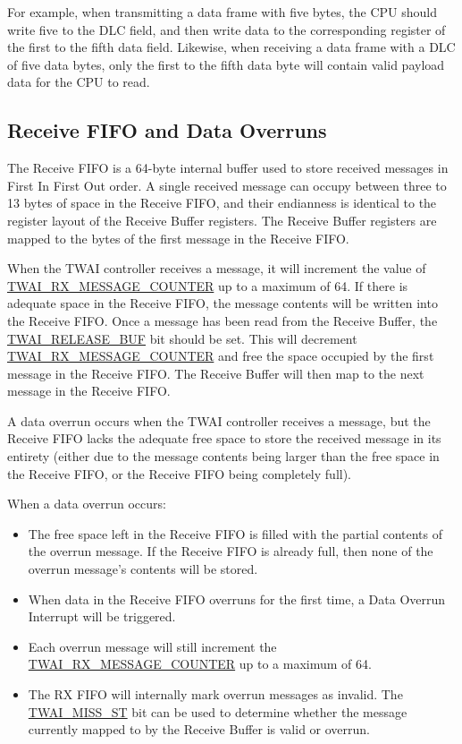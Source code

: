 \documentclass[main\_\_EN.tex]{subfiles}
\begin{document}
For example, when transmitting a data frame with five bytes, the CPU should write five to the DLC field, and then write data to the corresponding register of the first to the fifth data field. Likewise, when receiving a data frame with a DLC of five data bytes, only the first to the fifth data byte will contain valid payload data for the CPU to read.

\subsection{Receive FIFO and Data Overruns}

The Receive FIFO is a 64-byte internal buffer used to store received messages in First In First Out order. A single received message can occupy between three to 13 bytes of space in the Receive FIFO, and their endianness is identical to the register layout of the Receive Buffer registers. The Receive Buffer registers are mapped to the bytes of the first message in the Receive FIFO.

When the TWAI controller receives a message, it will increment the value of \hyperref[fielddesc:TWAIRXMESSAGECOUNTER]{TWAI\_RX\_MESSAGE\_COUNTER} up to a maximum of 64. If there is adequate space in the Receive FIFO, the message contents will be written into the Receive FIFO. Once a message has been read from the Receive Buffer, the \hyperref[fielddesc:TWAIRELEASEBUF]{TWAI\_RELEASE\_BUF} bit should be set. This will decrement \hyperref[fielddesc:TWAIRXMESSAGECOUNTER]{TWAI\_RX\_MESSAGE\_COUNTER} and free the space occupied by the first message in the Receive FIFO. The Receive Buffer will then map to the next message in the Receive FIFO.

A data overrun occurs when the TWAI controller receives a message, but the Receive FIFO lacks the adequate free space to store the received message in its entirety (either due to the message contents being larger than the free space in the Receive FIFO, or the Receive FIFO being completely full).

When a data overrun occurs:
\begin{itemize}
    \item The free space left in the Receive FIFO is filled with the partial contents of the overrun message. If the Receive FIFO is already full, then none of the overrun message's contents will be stored.
    \item When data in the Receive FIFO overruns for the first time, a Data Overrun Interrupt will be triggered.
    \item Each overrun message will still increment the  \hyperref[fielddesc:TWAIRXMESSAGECOUNTER]{TWAI\_RX\_MESSAGE\_COUNTER} up to a maximum of 64.
    \item The RX FIFO will internally mark overrun messages as invalid. The \hyperref[fielddesc:TWAIMISSST]{TWAI\_MISS\_ST} bit can be used to determine whether the message currently mapped to by the Receive Buffer is valid or overrun.
\end{itemize}
\end{document}
